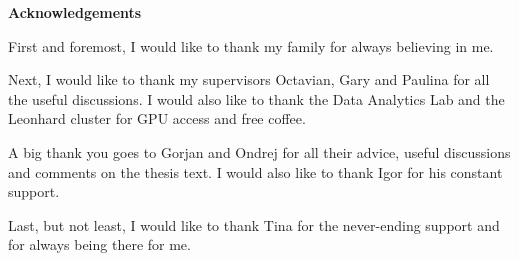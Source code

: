 
\newenvironment{acknowledgements}%
    {
    \begin{center}%
    \bfseries Acknowledgements\end{center}}%
    {\vfill\null}

\cleardoublepage
\begin{acknowledgements}

First and foremost, I would like to thank my family for always believing in me.

Next, I would like to thank my supervisors Octavian, Gary and Paulina for all the useful discussions. I would also like to thank the Data Analytics Lab and the Leonhard cluster for GPU access and free coffee.

A big thank you goes to Gorjan and Ondrej for all their advice, useful discussions and comments on the thesis text. I would also like to thank Igor for his constant support.

Last, but not least, I would like to thank Tina for the never-ending support and for always being there for me.

\end{acknowledgements}